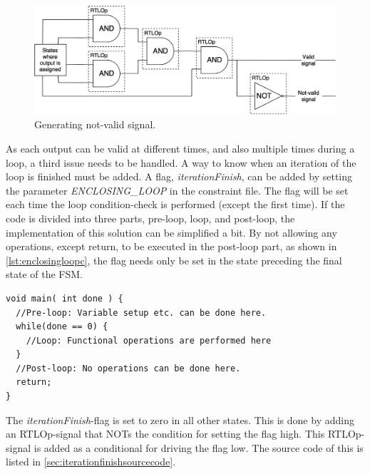 \begin{figure}[hbpt]
\centering
\includegraphics[width=\textwidth]{../figs/ValidSignals.png}
\caption{\label{fig:validsignals}Generating not-valid signal.}
\end{figure}

As each output can be valid at different times, and also multiple times during a loop, a third issue needs to be handled. A way to know when an iteration of the loop is finished must be added. A flag, \textit{iterationFinish}, can be added by setting the parameter \textit{ENCLOSING\_LOOP} in the constraint file. The flag will be set each time the loop condition-check is performed (except the first time). If the code is divided into three parts, pre-loop, loop, and post-loop, the implementation of this solution can be simplified a bit. By not allowing any operations, except return, to be executed in the post-loop part, as shown in \cref{lst:enclosingloopc}, the flag needs only be set in the state preceding the final state of the FSM.
\lstset{language=C,style=Cstyle}
\begin{lstlisting}[caption={Sectioning of a program with enclosing while-loop},label=lst:enclosingloopc]
void main( int done ) {
  //Pre-loop: Variable setup etc. can be done here.
  while(done == 0) {
    //Loop: Functional operations are performed here
  }
  //Post-loop: No operations can be done here.
  return;
}
\end{lstlisting}
The \textit{iterationFinish}-flag is set to zero in all other states. This is done by adding an RTLOp-signal that NOTs the condition for setting the flag high. This RTLOp-signal is added as a conditional for driving the flag low. The source code of this is listed in \cref{sec:iterationfinishsourcecode}.

